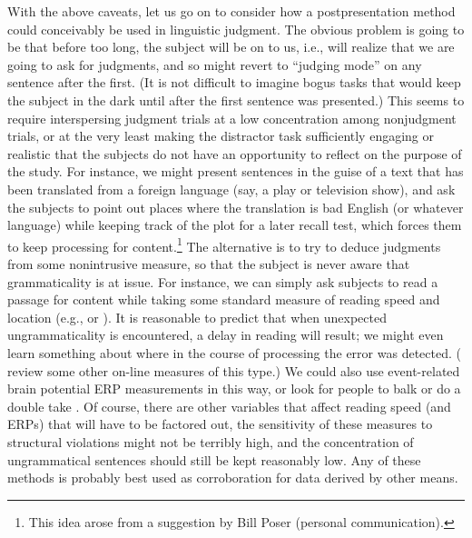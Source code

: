 With the above caveats, let us go on to consider how a postpresentation method could conceivably be used in linguistic judgment. The obvious problem is going to be that before too long, the subject will be on to us, i.e., will realize that we are going to ask for judgments, and so might revert to ``judging mode'' on any
sentence after the first. (It is not difficult to imagine bogus tasks that would keep the subject in the dark until after the first sentence was presented.) This seems to require interspersing judgment trials at a low concentration among nonjudgment trials, or at the very least making the distractor task sufficiently engaging or realistic that the subjects do not have an opportunity to reflect on the purpose of the study. For instance, we might present sentences in the guise of a text that has been translated from a foreign language (say, a play or television show), and ask the subjects to point out places where the translation is bad English (or whatever language) while keeping track of the plot for a later recall test, which forces them to keep processing for content.\footnote{This idea arose from a suggestion by Bill Poser (personal communication).}
 The alternative is to try to deduce judgments from some nonintrusive measure, so that the subject is never aware that grammaticality is at issue. For instance, we can simply ask subjects to read a passage for content while taking some standard measure of reading speed and location (e.g.,  or ). It is reasonable to predict that when unexpected ungrammaticality is encountered, a delay in reading will result; we might even learn something about where in the course of processing the error was detected. (\citet{KutasEtAl1983} review some other on-line measures of this type.) We could also use event-related brain potential ERP measurements in this way, or look for people to balk or do a double take \citep{Newmeyer1983}. Of course, there are other variables that affect reading speed (and ERPs) that will have to be factored out, the sensitivity of these measures to structural violations might not be terribly high, and the concentration of ungrammatical sentences should still be kept reasonably low. Any of these methods is probably best used as corroboration for data derived by other means.

